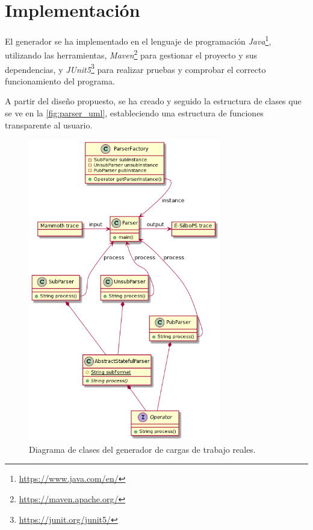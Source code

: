 \section{Implementación} \label{sct:desarrollo_implementacion}

El generador se ha implementado en el lenguaje de programación
\textit{Java}\footnote{\href{https://www.java.com/en/}{https://www.java.com/en/}}, utilizando
las herramientas, \textit{Maven}\footnote{\href{https://maven.apache.org/}{https://maven.apache.org/}} 
para gestionar el proyecto y sus dependencias, y 
\textit{JUnit5}\footnote{\href{https://junit.org/junit5/}{https://junit.org/junit5/}} para realizar
pruebas y comprobar el correcto funcionamiento del programa.

A partir del diseño propuesto, se ha creado y seguido la estructura de clases que se ve en la 
\autoref{fig:parser_uml}, estableciendo una estructura de funciones transparente al usuario.

\begin{figure}[htpb]
    \centering
    \includegraphics[width=0.75\textwidth]{images/plantuml/ParserPlantUML.png}
    \caption{Diagrama de clases del generador de cargas de trabajo reales.}
    \label{fig:parser_uml}
\end{figure}

